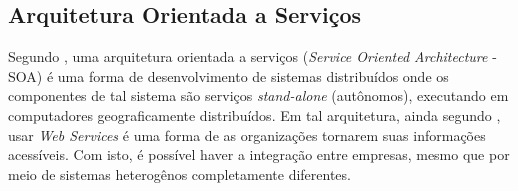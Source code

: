 \subsection{Arquitetura Orientada a Serviços}

Segundo \cite{sommerville2011soft}, uma arquitetura orientada a serviços (\textit{Service Oriented Architecture} - SOA)
é uma forma de desenvolvimento de sistemas distribuídos onde os componentes de tal sistema são serviços \textit{stand-alone} (autônomos),
executando em computadores geograficamente distribuídos. Em tal arquitetura, ainda segundo \cite{sommerville2011soft}, 
usar \textit{Web Services} é uma forma de as organizações tornarem suas informações acessíveis. Com isto, é possível
haver a integração entre empresas, mesmo que por meio de sistemas heterogênos completamente diferentes.

